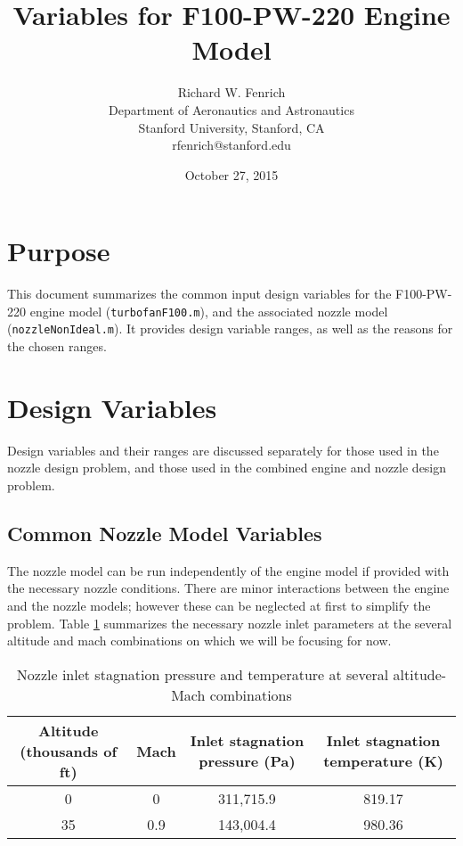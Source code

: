 \documentclass{article}
\title{Variables for F100-PW-220 Engine Model}
\author{Richard W. Fenrich\\Department of Aeronautics and Astronautics\\Stanford University, Stanford, CA\\rfenrich@stanford.edu}
\date{October 27, 2015}
\begin{document}
\maketitle

\section{Purpose}
This document summarizes the common input design variables for the F100-PW-220 engine model (\texttt{turbofanF100.m}), and the associated nozzle model (\texttt{nozzleNonIdeal.m}). It provides design variable ranges, as well as the reasons for the chosen ranges. 

\section{Design Variables}

Design variables and their ranges are discussed separately for those used in the nozzle design problem, and those used in the combined engine and nozzle design problem.

\subsection{Common Nozzle Model Variables}

The nozzle model can be run independently of the engine model if provided with the necessary nozzle conditions. There are minor interactions between the engine and the nozzle models; however these can be neglected at first to simplify the problem. Table \ref{tab:nozzleInletParameters} summarizes the necessary nozzle inlet parameters at the several altitude and mach combinations on which we will be focusing for now.

\begin{table}
\caption{Nozzle inlet stagnation pressure and temperature at several altitude-Mach combinations}
\label{tab:nozzleInletParameters}
\begin{center}
\begin{tabular}[]{c | c | c | c}
Altitude (thousands of ft) & Mach & Inlet stagnation pressure (Pa) & Inlet stagnation temperature (K) \\ \hline
0 & 0 & 311,715.9 & 819.17 \\
35 & 0.9 & 143,004.4 & 980.36 \\
\end{tabular}
\end{center}
\end{table}
\end{document}
